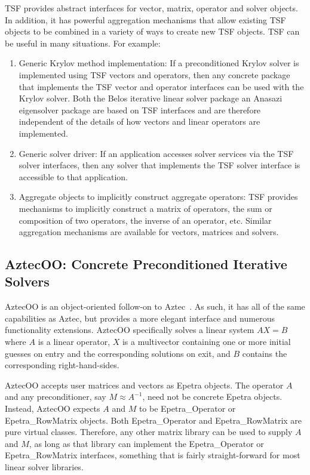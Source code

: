 \documentclass[acmtoms,acmnow]{acmtrans2m}
\begin{document}
TSF provides abstract interfaces for vector, matrix, operator and 
solver objects.  In addition, it has powerful aggregation mechanisms 
that allow existing TSF objects to be combined in a variety of ways 
to create new TSF objects.  TSF can be useful in many situations.  
For example:
\begin{enumerate}

\item Generic Krylov method implementation:  If a preconditioned Krylov solver 
is implemented using TSF vectors and operators, then any concrete package 
that implements the TSF vector and operator interfaces can be used 
with the Krylov solver.  Both the Belos iterative linear solver
package an Anasazi eigensolver package are based on TSF interfaces and
are therefore independent of the details of how vectors and linear
operators are implemented.  

\item Generic solver driver:  If an application accesses solver 
services via the TSF solver interfaces, then any solver that 
implements the TSF solver interface is accessible to that application.

\item Aggregate objects to implicitly construct aggregate operators: 
TSF provides mechanisms to implicitly construct a matrix of operators, 
the sum or composition of two operators, the inverse of an operator, 
etc.  Similar aggregation mechanisms are available for vectors, matrices
and solvers.

\end{enumerate}

\subsection{AztecOO: Concrete Preconditioned Iterative Solvers}

AztecOO is an object-oriented follow-on to Aztec~\cite{Aztec2.1}.  
As such, it has all of the same capabilities as Aztec, but provides 
a more elegant interface and numerous functionality extensions.  
AztecOO specifically solves a linear system $AX=B$ where $A$ is a 
linear operator, $X$ is a multivector containing one or more initial 
guesses on entry and the corresponding solutions on exit, and $B$ 
contains the corresponding right-hand-sides.

AztecOO accepts user matrices and vectors as Epetra objects.  The 
operator $A$ and any preconditioner, say $M \approx A^{-1}$, need 
not be concrete Epetra objects.  Instead, AztecOO expects $A$ and 
$M$ to be Epetra\_Operator or Epetra\_RowMatrix objects.  Both 
Epetra\_Operator and Epetra\_RowMatrix are pure virtual classes.  
Therefore, any other matrix library can be used to supply $A$ 
and $M$, as long as that library can implement the  Epetra\_Operator 
or Epetra\_RowMatrix interfaces, something that is fairly 
straight-forward for most linear solver libraries.
\end{document}
